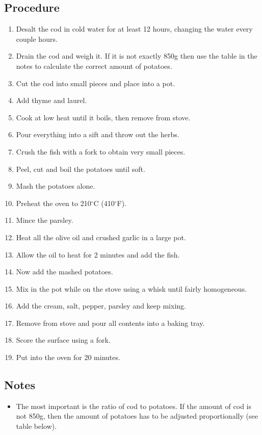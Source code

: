 \documentclass[10pt]{book}
\newcommand{\degree}{$^\circ$}
\begin{document}
\subsection*{Procedure}
	\begin{enumerate}
		\item Desalt the cod in cold water for at least 12 hours, changing the water every couple hours.
		\item Drain the cod and weigh it. If it is not exactly 850g then use the table in the notes to calculate the correct amount of potatoes.
		\item Cut the cod into small pieces and place into a pot.
		\item Add thyme and laurel.
		\item Cook at low heat until it boils, then remove from stove.
		\item Pour everything into a sift and throw out the herbs.
		\item Crush the fish with a fork to obtain very small pieces.
		\item Peel, cut and boil the potatoes until soft.
		\item Mash the potatoes alone.
		\item Preheat the oven to 210{\degree}C (410{\degree}F).
		\item Mince the parsley.
		\item Heat all the olive oil and crushed garlic in a large pot.
		\item Allow the oil to heat for 2 minutes and add the fish.
		\item Now add the mashed potatoes.
		\item Mix in the pot while on the stove using a whisk until fairly homogeneous.
		\item Add the cream, salt, pepper, parsley and keep mixing.
		\item Remove from stove and pour all contents into a baking tray.
		\item Score the surface using a fork.
		\item Put into the oven for 20 minutes.
	\end{enumerate}
\subsection*{Notes}
	\begin{itemize}
		\item The most important is the ratio of cod to potatoes. If the amount of cod is not 850g, then the amount of potatoes has to be adjusted proportionally (see table below).
	\end{itemize}
	
\end{document}
